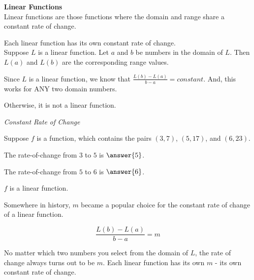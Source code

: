 \documentclass{ximera}
\begin{document}
\begin{definition} \textbf{\textcolor{green!50!black}{Linear Functions}} \\

Linear functions are those functions where the domain and range share a constant rate of change.  

\end{definition}


Each linear function has its own constant rate of change. \\


Suppose $L$ is a linear function.  Let $a$ and $b$ be numbers in the domain of $L$.  Then $L(a)$ and $L(b)$ are the corresponding range values.

Since $L$ is a linear function, we know that $\frac{L(b) - L(a)}{b - a} = constant$.  And, this works for ANY two domain numbers.

Otherwise, it is not a linear function.







\begin{example} \textit{Constant Rate of Change}


Suppose $f$ is a function, which contains the pairs $(3, 7)$, $(5, 17)$, and $(6, 23)$.


The rate-of-change from $3$ to $5$ is $\answer{5}$.

The rate-of-change from $5$ to $6$ is $\answer{6}$.

\begin{question} 
$f$ is a linear function.
\begin{multipleChoice}
\end{multipleChoice}
\end{question}

\end{example}


Somewhere in history, $m$ became a popular choice for the constant rate of change of a linear function.



\[
\frac{L(b) - L(a)}{b - a} = m
\]





No matter which two numbers you select from the domain of $L$, the rate of change always turns out to be $m$.  Each linear function has its own $m$ - its own constant rate of change.
\end{document}
